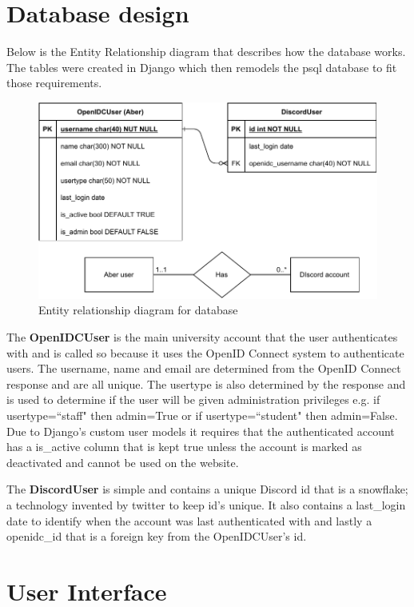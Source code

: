 \section{Database design}\label{sec2:database}
Below is the Entity Relationship diagram that describes how the database works. The tables were created in Django which then remodels the psql \cite{psql} database to fit those requirements. 

\begin{figure}[H]
	\centering
	\includegraphics[width=0.8\linewidth]{Figures/database-er-0}
	\caption{Entity relationship diagram for database}
	\label{fig:database-er}
\end{figure}
The \textbf{OpenIDCUser} is the main university account that the user authenticates with and is called so because it uses the OpenID Connect \cite{OpenID} system to authenticate users. The username, name and email are determined from the OpenID Connect response and are all unique. The usertype is also determined by the response and is used to determine if the user will be given administration privileges e.g. if usertype=``staff" then admin=True or if usertype=``student" then admin=False. Due to Django's custom user models it requires that the authenticated account has a is\_active column that is kept true unless the account is marked as deactivated and cannot be used on the website.

The \textbf{DiscordUser} is simple and contains a unique Discord id that is a snowflake; a technology invented by twitter to keep id's unique. It also contains a last\_login date to identify when the account was last authenticated with and lastly a openidc\_id that is a foreign key from the OpenIDCUser's id.

\section{User Interface}\label{sec2:ui}

